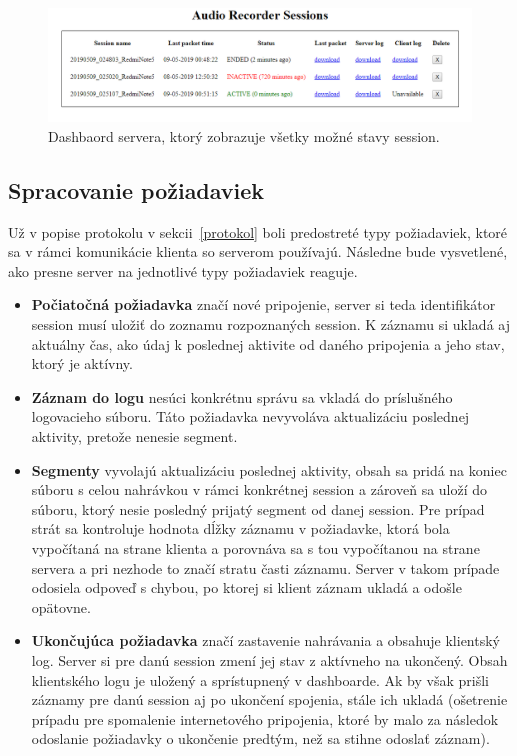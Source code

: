 \begin{figure}[!hbt]
	\centering
	\includegraphics[width=1\textwidth]{obrazky-figures/dashboard.png}
	\caption{Dashbaord servera, ktorý zobrazuje všetky možné stavy session.}
	\label{dashboard}
\end{figure}


\subsection*{Spracovanie požiadaviek}

Už v popise protokolu v sekcii~\ref{protokol} boli predostreté typy požiadaviek, ktoré sa v rámci komunikácie klienta so serverom používajú. Následne bude vysvetlené, ako presne server na jednotlivé typy požiadaviek reaguje.

\begin{itemize}
\item {\textbf{Počiatočná požiadavka} značí nové pripojenie, server si teda identifikátor session musí uložiť do zoznamu rozpoznaných session. K záznamu si ukladá aj aktuálny čas, ako údaj k poslednej aktivite od daného pripojenia a jeho stav, ktorý je aktívny.}
\item {\textbf{Záznam do logu} nesúci konkrétnu správu sa vkladá do príslušného logovacieho súboru. Táto požiadavka nevyvoláva aktualizáciu poslednej aktivity, pretože nenesie segment.}
\item {\textbf{Segmenty} vyvolajú aktualizáciu poslednej aktivity, obsah sa pridá na koniec súboru s celou nahrávkou v rámci konkrétnej session a zároveň sa uloží do súboru, ktorý nesie posledný prijatý segment od danej session. Pre prípad strát sa kontroluje hodnota dĺžky záznamu v požiadavke, ktorá bola vypočítaná na strane klienta a porovnáva sa s tou vypočítanou na strane servera a pri nezhode to značí stratu časti záznamu. Server v takom prípade odosiela odpoveď s chybou, po ktorej si klient záznam ukladá a odošle opätovne.}
\item {\textbf{Ukončujúca požiadavka} značí zastavenie nahrávania a obsahuje klientský log. Server si pre danú session zmení jej stav z aktívneho na ukončený. Obsah klientského logu je uložený a sprístupnený v dashboarde. Ak by však prišli záznamy pre danú session aj po ukončení spojenia, stále ich ukladá (ošetrenie prípadu pre spomalenie internetového pripojenia, ktoré by malo za následok odoslanie požiadavky o ukončenie predtým, než sa stihne odoslať záznam).}
\end{itemize}

